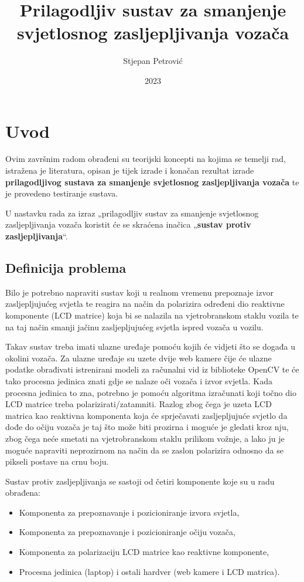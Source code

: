 \documentclass{foi}
\title{Prilagodljiv sustav za smanjenje svjetlosnog zasljepljivanja vozača}
\author{Stjepan Petrović}
\date{2023}
\begin{document}
\maketitle

\tableofcontents

\pagestyle{plain}
\chapter{Uvod}

Ovim završnim radom obrađeni su teorijski koncepti na kojima se temelji rad, istražena je literatura, opisan je tijek izrade i konačan rezultat izrade \textbf{prilagodljivog sustava za smanjenje svjetlosnog zasljepljivanja vozača} te je provedeno testiranje sustava.

U nastavku rada za izraz „prilagodljiv sustav za smanjenje svjetlosnog zasljepljivanja vozača koristit će se skraćena inačica „\textbf{sustav protiv zasljepljivanja}“.

\section{Definicija problema}

 Bilo je potrebno napraviti sustav koji u realnom vremenu prepoznaje izvor zasljepljujućeg svjetla te reagira na način da polarizira određeni dio reaktivne komponente (LCD matrice) koja bi se nalazila na vjetrobranskom staklu vozila te na taj način smanji jačinu zasljepljujućeg svjetla ispred vozača u vozilu.

 Takav sustav treba imati ulazne uređaje pomoću kojih će vidjeti što se događa u okolini vozača. Za ulazne uređaje su uzete dvije web kamere čije će ulazne podatke obrađivati istrenirani modeli za računalni vid iz biblioteke OpenCV te će tako procesna jedinica znati gdje se nalaze oči vozača i izvor svjetla. Kada procesna jedinica to zna, potrebno je pomoću algoritma izračunati koji točno dio LCD matrice treba polarizirati/zatamniti. Razlog zbog čega je uzeta LCD matrica kao reaktivna komponenta koja će sprječavati zasljepljujuće svjetlo da dođe do očiju vozača je taj što može biti prozirna i moguće je gledati kroz nju, zbog čega neće smetati na vjetrobranskom staklu prilikom vožnje, a lako ju je moguće napraviti neprozirnom na način da se zaslon polarizira odnosno da se pikseli postave na crnu boju.

\begin{flushleft}Sustav protiv zasljepljivanja se sastoji od četiri komponente koje su u radu obrađena:\end{flushleft}
\begin{itemize}[noitemsep]
    \item Komponenta za prepoznavanje i pozicioniranje izvora svjetla,
    \item Komponenta za prepoznavanje i pozicioniranje očiju vozača,
    \item Komponenta za polarizaciju LCD matrice kao reaktivne komponente,
    \item Procesna jedinica (laptop) i ostali hardver (web kamere i LCD matrica).
\end{itemize}
\end{document}

